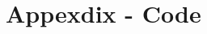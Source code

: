 \documentclass[conference,letterpaper]{IEEEtran}
\begin{document}
%








\section{Appexdix - Code} \label{sec:code}


\end{document}
